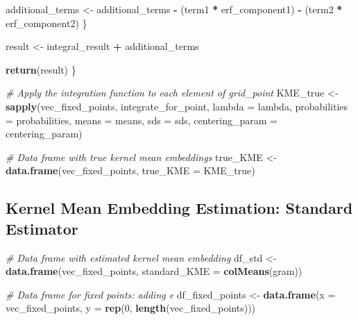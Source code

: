 \documentclass[
]{article}
\newenvironment{Shaded}{\begin{snugshade}}{\end{snugshade}}
\newcommand{\AttributeTok}[1]{\textcolor[rgb]{0.13,0.29,0.53}{#1}}
\newcommand{\CommentTok}[1]{\textcolor[rgb]{0.56,0.35,0.01}{\textit{#1}}}
\newcommand{\DecValTok}[1]{\textcolor[rgb]{0.00,0.00,0.81}{#1}}
\newcommand{\FunctionTok}[1]{\textcolor[rgb]{0.13,0.29,0.53}{\textbf{#1}}}
\newcommand{\NormalTok}[1]{#1}
\newcommand{\OtherTok}[1]{\textcolor[rgb]{0.56,0.35,0.01}{#1}}
\newcommand{\SpecialCharTok}[1]{\textcolor[rgb]{0.81,0.36,0.00}{\textbf{#1}}}
\begin{document}
\begin{Shaded}
\begin{Highlighting}[]
\NormalTok{    additional\_terms }\OtherTok{\textless{}{-}}\NormalTok{ additional\_terms }\SpecialCharTok{{-}}\NormalTok{ (term1 }\SpecialCharTok{*}\NormalTok{ erf\_component1) }\SpecialCharTok{{-}}\NormalTok{ (term2 }\SpecialCharTok{*}\NormalTok{ erf\_component2)}
\NormalTok{  \}}

\NormalTok{  result }\OtherTok{\textless{}{-}}\NormalTok{ integral\_result }\SpecialCharTok{+}\NormalTok{ additional\_terms}

  \FunctionTok{return}\NormalTok{(result)}
\NormalTok{\}}

\CommentTok{\# Apply the integration function to each element of grid\_point}
\NormalTok{KME\_true }\OtherTok{\textless{}{-}} \FunctionTok{sapply}\NormalTok{(vec\_fixed\_points, integrate\_for\_point,}
                   \AttributeTok{lambda =}\NormalTok{ lambda,}
                   \AttributeTok{probabilities =}\NormalTok{ probabilities,}
                   \AttributeTok{means =}\NormalTok{ means,}
                   \AttributeTok{sds =}\NormalTok{ sds,}
                   \AttributeTok{centering\_param =}\NormalTok{ centering\_param)}





\CommentTok{\# Data frame with true kernel mean embeddings}
\NormalTok{true\_KME }\OtherTok{\textless{}{-}} \FunctionTok{data.frame}\NormalTok{(vec\_fixed\_points, }\AttributeTok{true\_KME =}\NormalTok{ KME\_true)}
\end{Highlighting}
\end{Shaded}

\subsection{Kernel Mean Embedding Estimation: Standard
Estimator}\label{kernel-mean-embedding-estimation-standard-estimator}

\begin{Shaded}
\begin{Highlighting}[]
\CommentTok{\# Data frame with estimated kernel mean embedding}
\NormalTok{df\_std }\OtherTok{\textless{}{-}} \FunctionTok{data.frame}\NormalTok{(vec\_fixed\_points, }\AttributeTok{standard\_KME =} \FunctionTok{colMeans}\NormalTok{(gram))}

\CommentTok{\# Data frame for fixed points: adding e}
\NormalTok{df\_fixed\_points }\OtherTok{\textless{}{-}} \FunctionTok{data.frame}\NormalTok{(}\AttributeTok{x =}\NormalTok{ vec\_fixed\_points, }\AttributeTok{y =} \FunctionTok{rep}\NormalTok{(}\DecValTok{0}\NormalTok{, }\FunctionTok{length}\NormalTok{(vec\_fixed\_points)))}
\end{Highlighting}
\end{Shaded}
\end{document}
